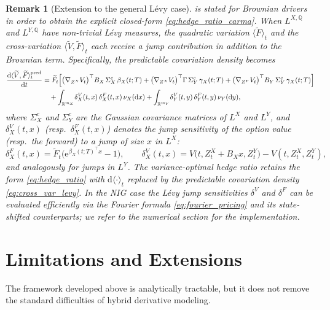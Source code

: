 \documentclass[10pt,a4paper,reqno]{amsart}
\newtheorem{remark}[theorem]{Remark}
\newcommand{\R}{\mathbb{R}}
\newcommand{\Q}{\mathbb{Q}}
\newcommand{\1}{\mathbbm{1}}
\newcommand{\dd}{\mathrm{d}}
\newcommand{\ee}{\mathrm{e}}
\begin{document}
\begin{remark}[Extension to the general Lévy case]
\label{rem:levy_hedge}
 is stated for Brownian drivers in order to
obtain the explicit closed-form \eqref{eq:hedge_ratio_carma}.
When $L^{X,\Q}$ and $L^{Y,\Q}$ have non-trivial Lévy measures, the
quadratic variation $\langle\widetilde{F}\rangle_t$ and the cross-variation
$\langle\widetilde{V},\widetilde{F}\rangle_t$ each receive a jump contribution
in addition to the Brownian term.
Specifically, the \emph{predictable} covariation density becomes
\begin{align}\label{eq:cross_var_levy}
  \frac{\dd\langle\widetilde{V},\widetilde{F}\rangle_t^{\mathrm{pred}}}{\dd t}
  &= \widetilde{F}_t\Bigl[
       \bigl(\nabla_{Z^X} V_t\bigr)^\top B_X\,\Sigma_X^c\,\beta_X(t;T)
       + \bigl(\nabla_{Z^X} V_t\bigr)^\top \Gamma\,\Sigma_Y^c\,\gamma_X(t;T)
       + \bigl(\nabla_{Z^Y} V_t\bigr)^\top B_Y\,\Sigma_Y^c\,\gamma_X(t;T)
     \Bigr]
     \nonumber\\
  &\quad
     + \int_{\R^{m_X}}\!
         \delta^V_X(t,x)\,\delta^F_X(t,x)\,\nu_X(\dd x)
     + \int_{\R^{m_Y}}\!
         \delta^V_Y(t,y)\,\delta^F_Y(t,y)\,\nu_Y(\dd y),
\end{align}
where $\Sigma_X^c$ and $\Sigma_Y^c$ are the Gaussian covariance matrices of
$L^X$ and $L^Y$, and $\delta^V_X(t,x)$ (resp.\ $\delta^F_X(t,x)$) denotes
the jump sensitivity of the option value (resp.\ the forward) to a jump of
size $x$ in $L^X$:
$$
  \delta^F_X(t,x)
  = \widetilde{F}_t\bigl(\ee^{\beta_X(t;T)^\top x}-1\bigr),
  \qquad
  \delta^V_X(t,x)
  = V\bigl(t,Z_t^X+B_X x, Z_t^Y\bigr) - V(t,Z_t^X,Z_t^Y),
$$
and analogously for jumps in $L^Y$.
The variance-optimal hedge ratio retains the form \eqref{eq:hedge_ratio}
with $\dd\langle\cdot\rangle_t$ replaced by the predictable covariation
density \eqref{eq:cross_var_levy}.
In the NIG case the Lévy jump sensitivities $\delta^V$ and $\delta^F$
can be evaluated efficiently via the Fourier formula
\eqref{eq:fourier_pricing} and its state-shifted counterparts; we refer to
the numerical section for the implementation.
\end{remark}



\section{Limitations and Extensions}\label{sec:limitations}

The framework developed above is analytically tractable, but it does not remove
the standard difficulties of hybrid derivative modeling.
\end{document}
